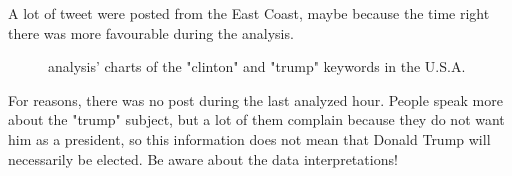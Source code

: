 \documentclass[a4paper,11pt]{report}
\begin{document}
A lot of tweet were posted from the East Coast, maybe because the time right there was more favourable during the analysis.
\begin{figure}[H]
\vspace{-5pt}
\begin{center}
\vspace{-20pt}
\caption{analysis' charts of the "clinton" and "trump" keywords in the U.S.A.}
\end{center}
\end{figure}

For reasons, there was no post during the last analyzed hour. People speak more about the "trump" subject, but a lot of them complain because they do not want him as a president, so this information does not mean that Donald Trump will necessarily be elected. Be aware about the data interpretations!
\end{document}
